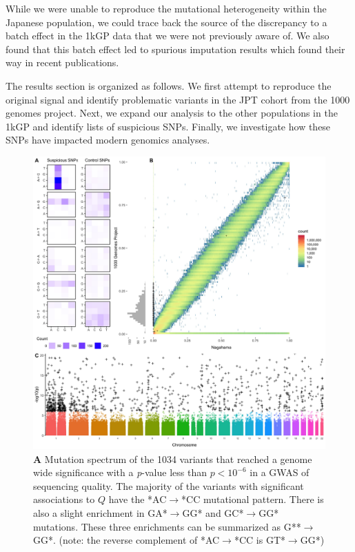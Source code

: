 \documentclass[9pt,lineno]{elife}
\begin{document}
While we were unable to reproduce the mutational heterogeneity within the Japanese population, we could trace back the source of the discrepancy to a batch effect in the 1kGP data that we were not previously aware of.
We also found that this batch effect led to spurious imputation results which found their way in recent publications.


The results section is organized as follows.
We first attempt to reproduce the original signal and identify problematic variants in the JPT cohort from the 1000 genomes project. 
Next, we expand our analysis to the other populations in the 1kGP and identify lists of suspicious SNPs.
Finally, we investigate how these SNPs have impacted modern genomics analyses.  
  

\begin{figure}
\includegraphics[width=\hsize,keepaspectratio]{./Figures/Figure1.jpg}
\caption{
\textbf{A} 
Mutation spectrum of the 1034 variants that reached a genome wide significance with a \textit{p}-value less than $p < 10^{-6}$  in a GWAS of sequencing quality. 
The majority of the variants with significant associations to $Q$ have the *AC${\rightarrow}$*CC mutational pattern. There is also a slight enrichment in GA*${\rightarrow}$GG* and GC*${\rightarrow}$GG* mutations. These three enrichments can be summarized as G**${\rightarrow}$GG*. (note: the reverse complement of *AC${\rightarrow}$*CC is GT*${\rightarrow}$GG*)
}
\end{figure}
\end{document}
